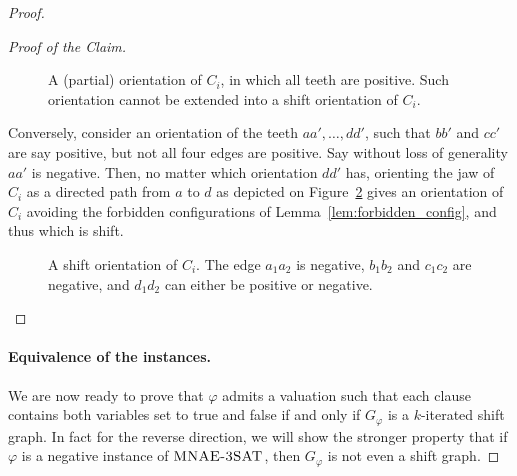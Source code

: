 \documentclass[11pt,a4aper]{article}
\newenvironment{poc}{\begin{proof}[Proof of the
    Claim]\renewcommand*{\qedsymbol}{$\blacksquare$}}{\end{proof}}
\renewcommand{\phi}{\varphi}
\newcommand*{\MNAE}{\textsc{MNAE-3SAT} }
\begin{document}
\begin{proof}
\begin{poc}
\begin{figure}[h!]
      \caption{A (partial) orientation of $C_i$, in which all teeth are
        positive. Such orientation cannot be extended into a shift orientation
        of $C_i$.}
      \label{fig:variable_gadget1}
    \end{figure}

    
    Conversely, consider an orientation of the teeth $aa', \ldots, dd'$, such
    that $bb'$ and $cc'$ are say positive, but not all four edges are
    positive. Say without loss of generality $aa'$ is negative. Then, no matter
    which orientation $dd'$ has, orienting the jaw of $C_i$ as a directed path
    from $a$ to $d$ as depicted on Figure~\ref{fig:variable_gadget} gives an
    orientation of $C_i$ avoiding the forbidden configurations of
    Lemma~\ref{lem:forbidden_config}, and thus which is shift.
    \begin{figure}[h!]
      \centering
      \caption{A shift orientation of $C_i$. The edge $a_1a_2$ is negative, $b_1b_2$ and
        $c_1c_2$ are negative, and $d_1d_2$ can either be positive or negative.}
      \label{fig:variable_gadget}
    \end{figure}
 \end{poc}

  \paragraph{Equivalence of the instances.}
  We are now ready to prove that $\phi$ admits a valuation such that each clause
  contains both variables set to true and false if and only if $G_\phi$ is a
  $k$-iterated shift graph. In fact for the reverse direction, we will show the
  stronger property that if $\phi$ is a negative instance of $\MNAE$, then
  $G_\phi$ is not even a shift graph.


\end{proof}
\end{document}
